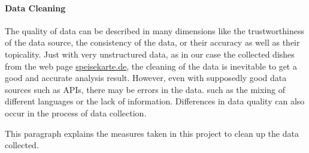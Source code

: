 \paragraph{Data Cleaning}
\label{par:cleaning}
The quality of data can be described in many dimensions like \zb{} the trustworthiness of the data source, the consistency of the data,
or their accuracy as well as their topicality.
Just with very unstructured data, as in our case the collected dishes from the web page \url{speisekarte.de}, the cleaning of the data is
inevitable to get a good and accurate analysis result.
However, even with supposedly good data sources such as \acp{API}, there may be errors in the data.
such as \zb{} the mixing of different languages or the lack of information.
Differences in data quality can also occur in the process of data collection.

This paragraph explains the measures taken in this project to clean up the data collected.

